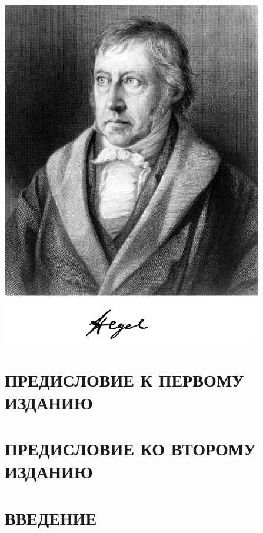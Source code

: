 \documentclass[a5paper, 11pt, twoside, onecolumn, openany]{memoir}
\begin{document}
\begin{center}
\includegraphics[width=11.4cm]{hegel-img001.png}
\end{center}

\restoregeometry

\mainmatter

\pagestyle{plain}

\chapter[Предисловие к первому изданию]{\large ПРЕДИСЛОВИЕ К ПЕРВОМУ ИЗДАНИЮ}
\thispagestyle{empty}


\clearpage

\chapter[Предисловие ко второму изданию]{\large ПРЕДИСЛОВИЕ КО ВТОРОМУ ИЗДАНИЮ}
\thispagestyle{empty}


\clearpage

\chapter[Введение]{\large ВВЕДЕНИЕ}
\thispagestyle{empty}

\end{document}
